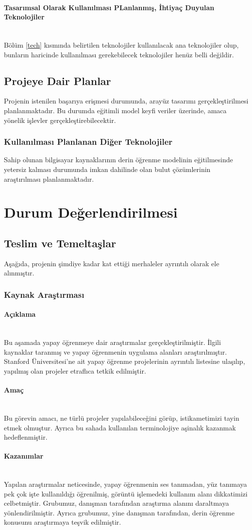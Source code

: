 \documentclass[12pt,a4paper]{article}
\newcommand{\subsubsubsection}[1]{\paragraph{#1}\mbox{}\\}
\begin{document}
    \subsubsubsection{Tasarımsal Olarak Kullanılması PLanlanmış, İhtiyaç Duyulan Teknolojiler}
    Bölüm \ref{tech} kısmında belirtilen teknolojiler kullanılacak ana teknolojiler olup, bunların haricinde kullanılması gerekebilecek teknolojiler
    henüz belli değildir.

    \subsection{Projeye Dair Planlar}
    Projenin istenilen başarıya erişmesi durumunda, arayüz tasarımı gerçekleştirilmesi planlanmaktadır.
    Bu durumda eğitimli model keyfi veriler üzerinde, amaca yönelik işlevler gerçekleştirebilecektir.

    \subsubsection{Kullanılması Planlanan Diğer Teknolojiler}
    Sahip olunan bilgisayar kaynaklarının derin öğrenme modelinin eğitilmesinde yetersiz kalması durumunda imkan dahilinde olan bulut çözümlerinin
    araştırılması planlanmaktadır.
    
    \section{Durum Değerlendirilmesi}

    \subsection{Teslim ve Temeltaşlar}
    Aşağıda, projenin şimdiye kadar kat ettiği merhaleler ayrıntılı olarak ele alınmıştır.

    \subsubsection{Kaynak Araştırması}
    \subsubsubsection{Açıklama}
    Bu aşamada yapay öğrenmeye dair araştırmalar gerçekleştirilmiştir. İlgili kaynaklar taranmış ve yapay öğrenmenin uygulama alanları araştırılmıştır.
    Stanford Üniversitesi'ne ait yapay öğrenme projelerinin ayrıntılı listesine ulaşılıp, yapılmış olan projeler etraflıca tetkik edilmiştir.

    \subsubsubsection{Amaç}
    Bu görevin amacı, ne türlü projeler yapılabileceğini görüp, istikametimizi tayin etmek olmuştur. 
    Ayrıca bu sahada kullanılan terminolojiye aşinalık kazanmak hedeflenmiştir.

    \subsubsubsection{Kazanımlar}
    Yapılan araştırmalar neticesinde, yapay öğrenmenin ses tanımadan, yüz tanımaya pek çok işte kullanıldığı öğrenilmiş,
     görüntü işlemedeki kullanım alanı dikkatimizi celbetmiştir. Grubumuz, danışman tarafından araştırma alanını
     daraltmaya yönlendirilmiştir. Ayrıca grubumuz, yine danışman tarafından, derin öğrenme konusunu araştırmaya teşvik edilmiştir.
\end{document}
